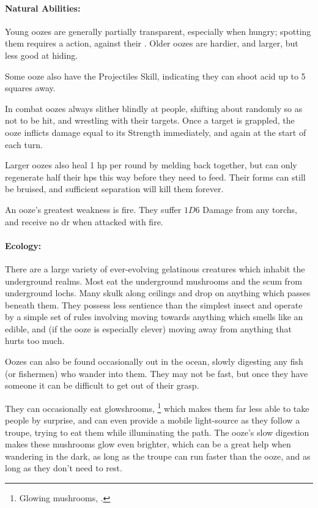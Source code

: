 \begin{multicols}{2}
\paragraph{Natural Abilities:} Young oozes are generally partially transparent, especially when hungry; spotting them requires a  action, against their .
Older oozes are hardier, and larger, but less good at hiding.

Some ooze also have the Projectiles Skill, indicating they can shoot acid up to 5 squares away.

In combat oozes always slither blindly at people, shifting about randomly so as not to be hit, and wrestling with their targets.
Once a target is grappled, the ooze inflicts damage equal to its Strength immediately, and again at the start of each turn.

Larger oozes also heal 1 \gls{hp} per round by melding back together, but can only regenerate half their \glspl{hp} this way before they need to feed.
Their forms can still be bruised, and sufficient separation will kill them forever.

An ooze's greatest weakness is fire.
They suffer $1D6$ Damage from any \glspl{torch}, and receive no \gls{dr} when attacked with fire.

\paragraph{Ecology:} There are a large variety of ever-evolving gelatinous creatures which inhabit the underground realms.
Most eat the underground mushrooms and the scum from underground lochs.
Many skulk along ceilings and drop on anything which passes beneath them.
They possess less sentience than the simplest insect and operate by a simple set of rules involving moving towards anything which smells like an edible, and (if the ooze is especially clever) moving away from anything that hurts too much.

Oozes can also be found occasionally out in the ocean, slowly digesting any fish (or fishermen) who wander into them.
They may not be fast, but once they have someone it can be difficult to get out of their grasp.

They can occasionally eat glowshrooms,%
\footnote{Glowing mushrooms, .}
which makes them far less able to take people by surprise, and can even provide a mobile light-source as they follow a troupe, trying to eat them while illuminating the path.
The ooze's slow digestion makes these mushrooms glow even brighter, which can be a great help when wandering in the dark, as long as the troupe can run faster than the ooze, and as long as they don't need to rest.


\end{multicols}
